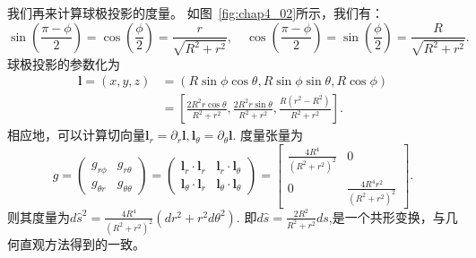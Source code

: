 \documentclass{article}
\begin{document}
我们再来计算球极投影的度量。
如图~\ref{fig:chap4_02}所示，我们有：
\begin{equation*}
\sin\left(\frac{\pi-\phi}{2}\right)
=\cos\left(\frac{\phi}{2}\right)=\frac{r}{\sqrt{R^{2}+r^{2}}}, \quad
\cos\left(\frac{\pi-\phi}{2}\right)
=\sin\left(\frac{\phi}{2}\right)=\frac{R}{\sqrt{R^{2}+r^{2}}}.
\end{equation*}
球极投影的参数化为
\begin{equation*}
\begin{aligned}
\mathbf{l}=(x, y, z)
&=(R\sin\phi\cos\theta, R\sin\phi\sin\theta, R\cos\phi) \\
&=\left[\frac{2R^{2}r\cos\theta}{R^{2}+r^{2}}, \frac{2R^{2}r\sin\theta}{R^{2}+r^{2}}, \frac{R(r^{2}-R^{2})}{R^{2}+r^{2}}\right].
\end{aligned}
\end{equation*}
相应地，可以计算切向量$\mathbf{l}_{r}=\partial_{r}\mathbf{l}, \mathbf{l}_\theta=\partial_{\theta}\mathbf{l}$.
度量张量为
\begin{equation}
g=\begin{pmatrix}
g_{r\phi} & g_{r\theta} \\
g_{\theta{r}} & g_{\theta\theta}
\end{pmatrix}
=\begin{pmatrix}
\mathbf{l}_{r}\cdot\mathbf{l}_{r} & \mathbf{l}_{r}\cdot\mathbf{l}_{\theta} \\
\mathbf{l}_{\theta}\cdot\mathbf{l}_{r} & \mathbf{l}_{\theta}\cdot\mathbf{l}_{\theta}
\end{pmatrix}
=\begin{bmatrix}
\frac{4R^{4}}{\left(R^{2} + r^{2}\right)^{2}} & 0 \\
0 & \frac{4R^{4}r^{2}}{\left(R^{2} + r^{2}\right)^{2}}
\end{bmatrix}.
\end{equation}
则其度量为$d\hat{s}^{2}=\frac{4R^{4}}{\left(R^{2} + r^{2}\right)^{2}}\left(dr^{2}+r^{2}d\theta^{2}\right)$.
即$d\hat{s}=\frac{2R^{2}}{R^{2} + r^{2}}ds$,是一个共形变换，与几何直观方法得到的一致。


%
%
\end{document}
